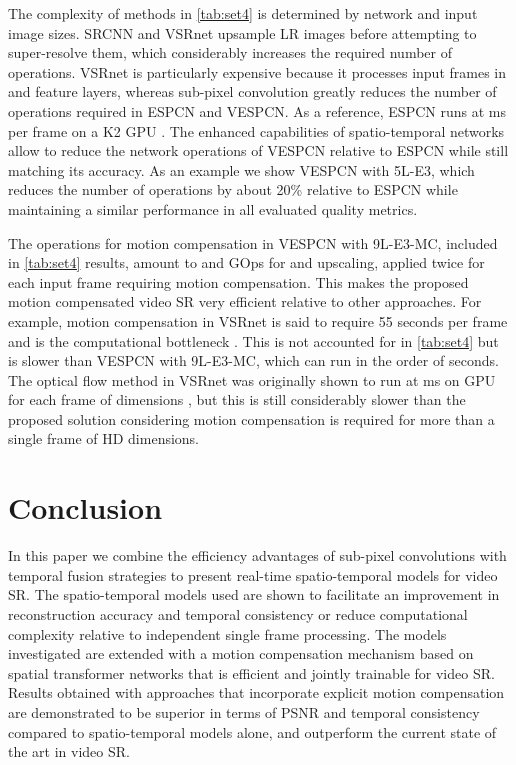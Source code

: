 \documentclass[10pt,twocolumn,letterpaper]{article}
\begin{document}
The complexity of methods in \cref{tab:set4} is determined by network and input image sizes. SRCNN and VSRnet upsample \gls{LR} images before attempting to super-resolve them, which considerably increases the required number of operations. VSRnet is particularly expensive because it processes  input frames in  and  feature layers, whereas sub-pixel convolution greatly reduces the number of operations required in ESPCN and VESPCN. As a reference, ESPCN  runs at ms per frame on a K2 GPU \cite{Shi2016}. The enhanced capabilities of spatio-temporal networks allow to reduce the network operations of VESPCN relative to ESPCN while still matching its accuracy. As an example we show VESPCN with 5L-E3, which reduces the number of operations by about 20\% relative to ESPCN while maintaining a similar performance in all evaluated quality metrics.



The operations for motion compensation in VESPCN with 9L-E3-MC, included in \cref{tab:set4} results, amount to  and  GOps for  and  upscaling, applied twice for each input frame requiring motion compensation. This makes the proposed motion compensated video \gls{SR} very efficient relative to other approaches. For example, motion compensation in VSRnet is said to require 55 seconds per frame and is the computational bottleneck \cite{Kappeler2016}. This is not accounted for in \cref{tab:set4} but is  slower than VESPCN with 9L-E3-MC, which can run in the order of  seconds. The optical flow method in VSRnet was originally shown to run at ms on GPU for each frame of dimensions , but this is still considerably slower than the proposed solution considering motion compensation is required for more than a single frame of HD dimensions.












\section{Conclusion}

In this paper we combine the efficiency advantages of sub-pixel convolutions with temporal fusion strategies to present real-time spatio-temporal models for video \gls{SR}. The spatio-temporal models used are shown to facilitate an improvement in reconstruction accuracy and temporal consistency or reduce computational complexity relative to independent single frame processing. The models investigated are extended with a motion compensation mechanism based on spatial transformer networks that is efficient and jointly trainable for video \gls{SR}. Results obtained with approaches that incorporate explicit motion compensation are demonstrated to be superior in terms of PSNR and temporal consistency compared to spatio-temporal models alone, and outperform the current state of the art in video \gls{SR}.

{\small


}
\end{document}
